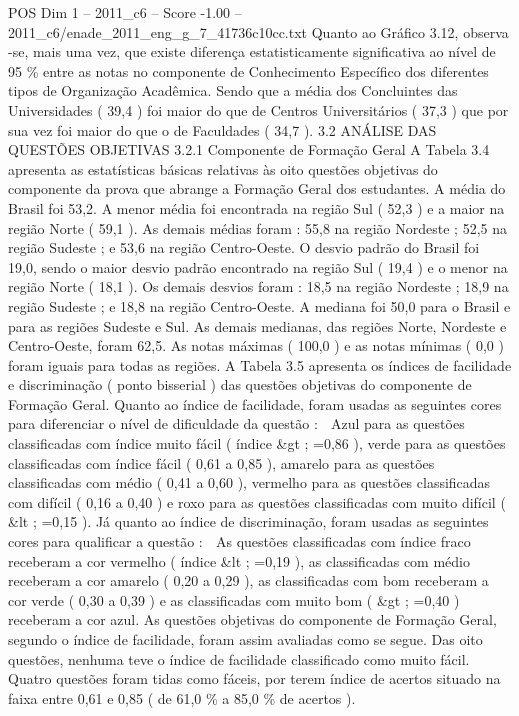 \begin{textsample}{POS Dim 1 – 2011\_c6 – Score -1.00 – 2011\_c6/enade\_2011\_eng\_g\_7\_41736c10cc.txt}
Quanto ao Gráfico 3.12, observa -se, mais uma vez, que existe diferença estatisticamente significativa ao nível de 95 \% entre as notas no componente de Conhecimento Específico dos diferentes tipos de Organização Acadêmica.
Sendo que a média dos Concluintes das Universidades ( 39,4 ) foi maior do que de Centros Universitários ( 37,3 ) que por sua vez foi maior do que o de Faculdades ( 34,7 ). 3.2 ANÁLISE DAS QUESTÕES OBJETIVAS 3.2.1 Componente de Formação Geral A Tabela 3.4 apresenta as estatísticas básicas relativas às oito questões objetivas do componente da prova que abrange a Formação Geral dos estudantes.
A média do Brasil foi 53,2.
A menor média foi encontrada na região Sul ( 52,3 ) e a maior na região Norte ( 59,1 ).
As demais médias foram : 55,8 na região Nordeste ; 52,5 na região Sudeste ; e 53,6 na região Centro-Oeste.
O desvio padrão do Brasil foi 19,0, sendo o maior desvio padrão encontrado na região Sul ( 19,4 ) e o menor na região Norte ( 18,1 ).
Os demais desvios foram : 18,5 na região Nordeste ; 18,9 na região Sudeste ; e 18,8 na região Centro-Oeste.
A mediana foi 50,0 para o Brasil e para as regiões Sudeste e Sul.
As demais medianas, das regiões Norte, Nordeste e Centro-Oeste, foram 62,5.
As notas máximas ( 100,0 ) e as notas mínimas ( 0,0 ) foram iguais para todas as regiões.
A Tabela 3.5 apresenta os índices de facilidade e discriminação ( ponto bisserial ) das questões objetivas do componente de Formação Geral.
Quanto ao índice de facilidade, foram usadas as seguintes cores para diferenciar o nível de dificuldade da questão :  Azul para as questões classificadas com índice muito fácil ( índice \&gt ; =0,86 ), verde para as questões classificadas com índice fácil ( 0,61 a 0,85 ), amarelo para as questões classificadas com médio ( 0,41 a 0,60 ), vermelho para as questões classificadas com difícil ( 0,16 a 0,40 ) e roxo para as questões classificadas com muito difícil ( \&lt ; =0,15 ).
Já quanto ao índice de discriminação, foram usadas as seguintes cores para qualificar a questão :  As questões classificadas com índice fraco receberam a cor vermelho ( índice \&lt ; =0,19 ), as classificadas com médio receberam a cor amarelo ( 0,20 a 0,29 ), as classificadas com bom receberam a cor verde ( 0,30 a 0,39 ) e as classificadas com muito bom ( \&gt ; =0,40 ) receberam a cor azul.
As questões objetivas do componente de Formação Geral, segundo o índice de facilidade, foram assim avaliadas como se segue.
Das oito questões, nenhuma teve o índice de facilidade classificado como muito fácil.
Quatro questões foram tidas como fáceis, por terem índice de acertos situado na faixa entre 0,61 e 0,85 ( de 61,0 \% a 85,0 \% de acertos ).

\end{textsample}
